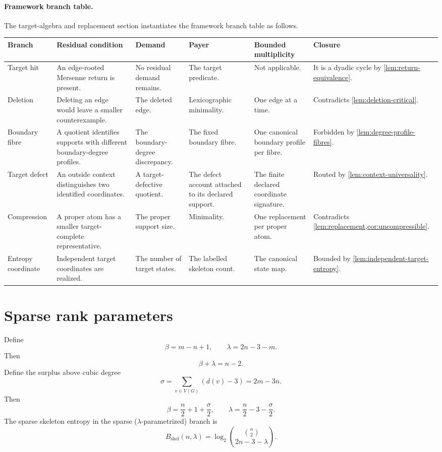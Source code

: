 \documentclass[11pt]{article}
\newcommand{\FrameworkBranchTableHeader}{%
\toprule
\textbf{Branch} & \textbf{Residual condition} & \textbf{Demand} & \textbf{Payer} & \textbf{Bounded multiplicity} & \textbf{Closure}\\
\midrule
}
\begin{document}
\paragraph{Framework branch table.}
The target-algebra and replacement section instantiates the framework branch
table as follows.
\begin{longtable}{L{0.13\textwidth} L{0.19\textwidth} L{0.14\textwidth} L{0.14\textwidth} L{0.17\textwidth} L{0.17\textwidth}}
\FrameworkBranchTableHeader
Target hit
&
An edge-rooted Mersenne return is present.
&
No residual demand remains.
&
The target predicate.
&
Not applicable.
&
It is a dyadic cycle by \cref{lem:return-equivalence}.
\\
\addlinespace
Deletion
&
Deleting an edge would leave a smaller counterexample.
&
The deleted edge.
&
Lexicographic minimality.
&
One edge at a time.
&
Contradicts \cref{lem:deletion-critical}.
\\
\addlinespace
Boundary fibre
&
A quotient identifies supports with different boundary-degree profiles.
&
The boundary-degree discrepancy.
&
The fixed boundary fibre.
&
One canonical boundary profile per fibre.
&
Forbidden by \cref{lem:degree-profile-fibres}.
\\
\addlinespace
Target defect
&
An outside context distinguishes two identified coordinates.
&
A target-defective quotient.
&
The defect account attached to its declared support.
&
The finite declared coordinate signature.
&
Routed by \cref{lem:context-universality}.
\\
\addlinespace
Compression
&
A proper atom has a smaller target-complete representative.
&
The proper support size.
&
Minimality.
&
One replacement per proper atom.
&
Contradicts \cref{lem:replacement,cor:uncompressible}.
\\
\addlinespace
Entropy coordinate
&
Independent target coordinates are realized.
&
The number of target states.
&
The labelled skeleton count.
&
The canonical state map.
&
Bounded by \cref{lem:independent-target-entropy}.
\\
\bottomrule
\end{longtable}

\section{Sparse rank parameters}

Define
\[
\beta=m-n+1,
\qquad
\lambda=2n-3-m.
\]
Then
\[
\boxed{\beta+\lambda=n-2.}
\]
Define the surplus above cubic degree
\[
\sigma=\sum_{v\in V(G)}(d(v)-3)=2m-3n.
\]
Then
\[
\boxed{\beta=\frac n2+1+\frac{\sigma}{2}},
\qquad
\boxed{\lambda=\frac n2-3-\frac{\sigma}{2}}.
\]
The sparse skeleton entropy in the sparse ($\lambda$-parametrized) branch is
\[
B_{\mathrm{skel}}(n,\lambda)=\log_2\binom{\binom n2}{2n-3-\lambda}.
\]
\end{document}
